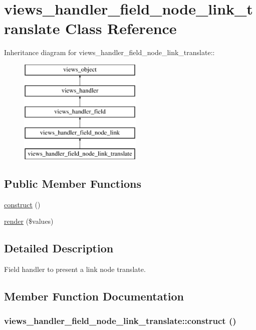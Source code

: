 \hypertarget{classviews__handler__field__node__link__translate}{
\section{views\_\-handler\_\-field\_\-node\_\-link\_\-translate Class Reference}
\label{classviews__handler__field__node__link__translate}
}
Inheritance diagram for views\_\-handler\_\-field\_\-node\_\-link\_\-translate::\begin{figure}[H]
\begin{center}
\leavevmode
\includegraphics[height=5cm]{classviews__handler__field__node__link__translate}
\end{center}
\end{figure}
\subsection*{Public Member Functions}
\begin{CompactItemize}
\item 
\hyperlink{classviews__handler__field__node__link__translate_99c65887da95497fc89023f57d07bc34}{construct} ()
\item 
\hyperlink{classviews__handler__field__node__link__translate_887213a10a0090481e9001547cff8439}{render} (\$values)
\end{CompactItemize}


\subsection{Detailed Description}
Field handler to present a link node translate. 

\subsection{Member Function Documentation}
\hypertarget{classviews__handler__field__node__link__translate_99c65887da95497fc89023f57d07bc34}{
\subsubsection[{construct}]{\setlength{\rightskip}{0pt plus 5cm}views\_\-handler\_\-field\_\-node\_\-link\_\-translate::construct ()}}
\label{classviews__handler__field__node__link__translate_99c65887da95497fc89023f57d07bc34}


